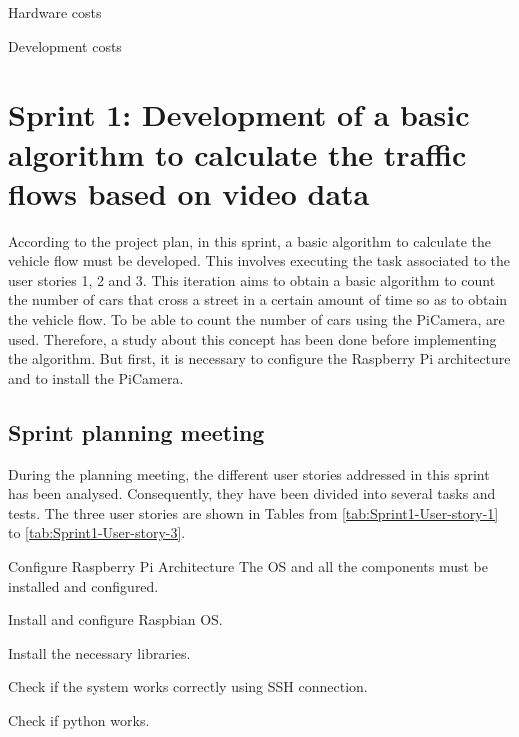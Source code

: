 \begin{table}[hp]
	\centering
	{\small
		
	}
	\caption{Hardware costs}
	\label{tab:Hardware-Costs}
\end{table}

\begin{table}[hp]
	\centering
	{\small
		
	}
	\caption{Development costs}
	\label{tab:Development-Costs}
\end{table}



\section{Sprint 1: Development of a basic algorithm to calculate the traffic flows based on video data}
\label{Section:Sprint1}
According to the project plan, in this sprint, a basic algorithm to calculate the vehicle flow must be developed. This involves executing the task associated to the user stories 1, 2 and 3. This iteration aims to obtain a basic algorithm to count the number of cars that cross a street in a certain amount of time so as to obtain the vehicle flow.  To be able to count the number of cars using the PiCamera,  are used. Therefore, a study about this concept has been done before implementing the algorithm. But first, it is necessary to configure the Raspberry Pi architecture and to install the PiCamera. 

\subsection{Sprint planning meeting}
During the planning meeting, the different user stories addressed in this sprint has been analysed. Consequently, they have been divided into several tasks and tests. The three user stories are shown in Tables from \ref{tab:Sprint1-User-story-1} to \ref{tab:Sprint1-User-story-3}.

{Configure Raspberry Pi Architecture}
{The \ac{OS} and all the components must be installed and configured.}
{	\item Install and configure Raspbian \ac{OS}.
	\item Install the necessary libraries.
}{	\item Check if the system works correctly using SSH connection.
	\item Check if python works.
}

